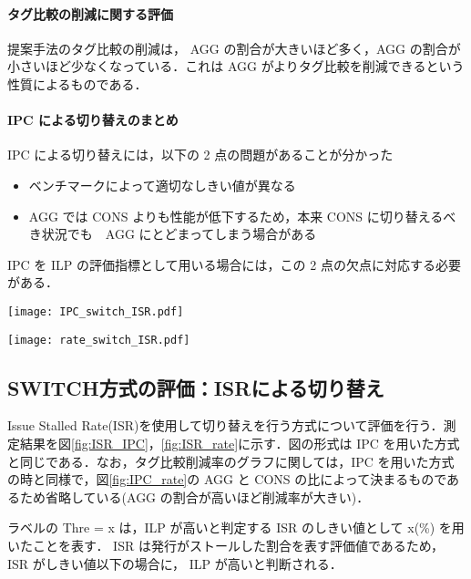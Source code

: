 \documentclass[twocolumn]{jsarticle}
\begin{document}
  \paragraph{タグ比較の削減に関する評価}
  提案手法のタグ比較の削減は， AGG の割合が大きいほど多く，AGG の割合が小さいほど少なくなっている．これは AGG がよりタグ比較を削減できるという性質によるものである．

  \paragraph{IPC による切り替えのまとめ}
  IPC による切り替えには，以下の 2 点の問題があることが分かった
  \begin{itemize}
    \item ベンチマークによって適切なしきい値が異なる
    \item AGG では CONS よりも性能が低下するため，本来 CONS に切り替えるべき状況でも　AGG にとどまってしまう場合がある
  \end{itemize}

  IPC を ILP の評価指標として用いる場合には，この 2 点の欠点に対応する必要がある．
  
  \begin{figure*}[ht]
    \centering
    \texttt{[image: IPC\_switch\_ISR.pdf]}
    \caption{SWITCH 方式による性能変化(ISR を用いた方式)}  
    \label{fig:ISR_IPC}
  \end{figure*}
  \begin{figure*}[ht]
    \centering
    \texttt{[image: rate\_switch\_ISR.pdf]}
    \caption{AGG モードである割合(ISR を用いた方式)}  
    \label{fig:ISR_rate}
  \end{figure*}

  \subsection{SWITCH方式の評価：ISRによる切り替え}
  Issue Stalled Rate(ISR)を使用して切り替えを行う方式について評価を行う．測定結果を図\ref{fig:ISR_IPC}，\ref{fig:ISR_rate}に示す．図の形式は IPC を用いた方式と同じである．なお，タグ比較削減率のグラフに関しては，IPC を用いた方式の時と同様で，図\ref{fig:IPC_rate}の AGG と CONS の比によって決まるものであるため省略している(AGG の割合が高いほど削減率が大きい)．
  
  ラベルの Thre = x は，ILP が高いと判定する ISR のしきい値として x(\%) を用いたことを表す． ISR は発行がストールした割合を表す評価値であるため， ISR がしきい値以下の場合に， ILP が高いと判断される．
\end{document}
